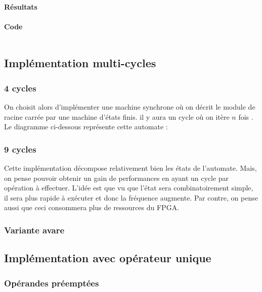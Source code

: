 \documentclass[12pt,a4paper]{article}
\newcommand{\inputvhdl}[1]{\inputminted[linenos,tabsize=2]{vhdl}{./src/#1.vhd}}
\begin{document}
\paragraph{Résultats}
\paragraph{Code}
\inputvhdl{SQRT_one_process}

\subsection{Implémentation multi-cycles}
\subsubsection{4 cycles}
On choisit alors d'implémenter une machine synchrone où on décrit le module de racine carrée par une machine d'états finis. il y aura un cycle où on itère $n$ fois . Le diagramme ci-dessous représente cette automate :
\begin{figure}[H]
\centering

\end{figure}

\subsubsection{9 cycles}
Cette implémentation décompose relativement bien les états de l'automate. Mais, on pense pouvoir obtenir un gain de performances en ayant un cycle par opération à effectuer. L'idée est que vu que l'état sera combinatoirement simple, il sera plus rapide  à exécuter et donc la fréquence augmente. Par contre, on pense aussi que ceci consommera plus de ressources du FPGA.
\begin{figure}[H]
	\centering
	
\end{figure}
\subsubsection{Variante avare} %

%

\subsection{Implémentation avec opérateur unique}
\subsubsection{Opérandes préemptées}
\end{document}
